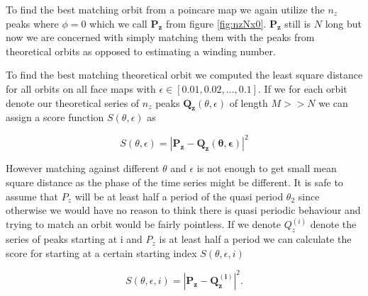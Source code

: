To find the best matching orbit from a poincare map we again utilize the $n_z$ peaks where $\phi = 0$ which we call $\mathbf{P_z}$ from figure \ref{fig:nzNx0}. $\mathbf{P_z}$ still is $N$ long but now we are concerned with simply matching them with the peaks from theoretical orbits as opposed to estimating a winding number.


To find the best matching theoretical orbit we computed the least square distance for all orbits on all face maps with $\epsilon \in [0.01, 0.02, ..., 0.1]$. If we for each orbit denote our theoretical series of $n_z$ peaks $\mathbf{Q_z}(\theta, \epsilon)$ of length $M >> N$ we can assign a score function $S(\theta, \epsilon)$ as

\begin{equation}
S(\theta, \epsilon) = \left| \mathbf{P_z} - \mathbf{Q_z(\theta, \epsilon)} \right|^2
\end{equation}

However matching against different $\theta$ and $\epsilon$ is not enough to get small mean square distance as the phase of the time series might be different. It is safe to assume that $P_z$ will be at least half a period of the quasi period $\theta_2$ since otherwise we would have no reason to think there is quasi periodic behaviour and trying to match an orbit would be fairly pointless. If we denote $Q_z^{(i)}$ denote the series of peaks starting at i and  $P_z$ is at least half a period we can calculate the score for starting at a certain starting index $S(\theta, \epsilon, i)$

\begin{equation}
S(\theta, \epsilon, i) = \left| \mathbf{P_z} - \mathbf{Q_z^{(i)}} \right|^2.
\end{equation}



